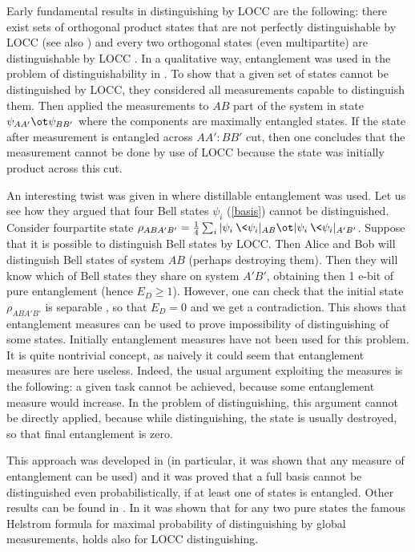 \documentclass[rmp,12pt,preprint]{revtex4-2}
\begin{document}
Early fundamental results in distinguishing by LOCC are the following:
there exist sets of orthogonal product states that are not perfectly
distinguishable by LOCC \cite{Bennett-nlwe} (see also \cite{WH2002})
and every two orthogonal states (even multipartite) are
distinguishable by LOCC \cite{Walgate-twoent}. In a qualitative way,
entanglement was used in the problem of distinguishability in
\cite{hiding-prl}.  To show that a given set of states cannot be
distinguished by LOCC, they considered all measurements capable to
distinguish them. Then applied the measurements to $AB$ part of the
system in state $\psi_{AA'}\ot \psi_{BB'}$ where the components are
maximally entangled states. If the state after measurement is
entangled across $AA':BB'$ cut, then one concludes that the measurement cannot be done by
use of LOCC because the state was initially product across this cut.

An interesting twist was given in \cite{BellPRL} where distillable
entanglement was used. Let us see how they argued that four Bell
states $\psi_i$ (\ref{basis}) cannot be distinguished. Consider fourpartite state
$\rho_{ABA'B'}={1\over 4}\sum_i |\psi_i\>\<\psi_i|_{AB} \ot
|\psi_i\>\<\psi_i|_{A'B'}$. Suppose that it is possible to distinguish
Bell states by LOCC. Then Alice and Bob will distinguish Bell states
of system $AB$ (perhaps destroying them). Then they will know which of
Bell states they share on system $A'B'$, obtaining then 1 e-bit of
pure entanglement (hence $E_D\geq 1$). However, one can check that the
initial state $\rho_{ABA'B'}$ is separable \cite{Smolin-unlock}, so that $E_D=0$
and we get a contradiction.  This shows that entanglement measures can
be used to prove impossibility of distinguishing of some
states. Initially entanglement measures have not been used for this
problem. It is quite nontrivial concept, as naively it could seem that
entanglement measures are here useless. Indeed, the usual argument
exploiting the measures is the following: a given task cannot be
achieved, because some entanglement measure would increase. In the
problem of distinguishing, this argument cannot be directly applied,
because while distinguishing, the state is usually destroyed, so that
final entanglement is zero.

This approach was developed in \cite{morenon} (in particular, it was shown
that any measure of entanglement can be used) and it was proved that a
full basis cannot be distinguished even probabilistically, if at least
one of states is entangled. Other results can be found in
\cite{VirmaniSPM2001-locc-discr, Fan-LOCCdist,Nathanson-LOCCdist}. In
\cite{VirmaniSPM2001-locc-discr} it was shown that for any two pure
states the famous Helstrom formula for maximal probability of distinguishing
by global measurements, holds also for LOCC distinguishing.
\end{document}
